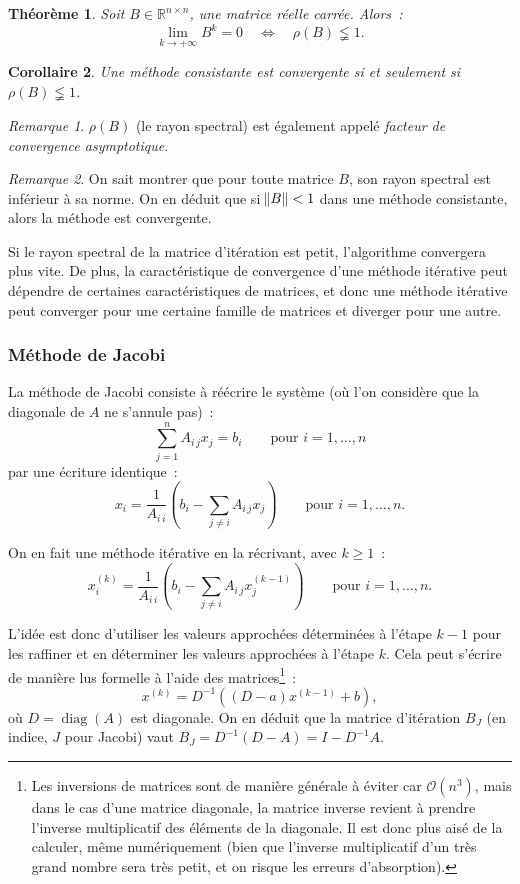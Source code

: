 \documentclass{article}
\newtheorem{thm}{Théorème}[section]
\newtheorem{cor}[thm]{Corollaire}
\theoremstyle{definition}
\theoremstyle{remark}
\newtheorem*{rmq}{Remarque}
\DeclareMathOperator{\diag}{diag}  %
\newcommand{\R}{\mathbb R}
\begin{document}
		\begin{thm} Soit $B \in \R^{n \times n}$, une matrice réelle carrée. Alors~:
		\[\lim_{k \to +\infty}B^k = 0\quad\iff\quad\rho(B) \lneqq 1.\]
		\end{thm}

		\begin{cor} Une méthode consistante est convergente si et seulement si $\rho(B) \lneqq 1$. \end{cor}

		\begin{rmq} $\rho(B)$ (le rayon spectral) est également appelé \emph{facteur de convergence asymptotique}. \end{rmq}

		\begin{rmq} On sait montrer que pour toute matrice $B$, son rayon spectral est inférieur à sa norme. On en déduit que si $\norm B < 1$ dans une méthode
		consistante, alors la méthode est convergente.
		\end{rmq}

		Si le rayon spectral de la matrice d'itération est petit, l'algorithme convergera plus vite. De plus, la caractéristique de convergence d'une méthode
		itérative peut dépendre de certaines caractéristiques de matrices, et donc une méthode itérative peut converger pour une certaine famille de matrices et
		diverger pour une autre.

		\subsubsection{Méthode de Jacobi}
		La méthode de Jacobi consiste à réécrire le système (où l'on considère que la diagonale de $A$ ne s'annule pas)~:
		\[\sum_{j=1}^nA_{i\,j}x_j = b_i\qquad\text{pour }i=1, \dotsc, n\]
		par une écriture identique~:
		\[x_i = \frac 1{A_{i\,i}}\left(b_i - \sum_{j \neq i}A_{i\,j}x_j\right)\qquad\text{pour }i=1, \dotsc, n.\]

		On en fait une méthode itérative en la récrivant, avec $k \geq 1$~:
		\[x^{(k)}_i = \frac 1{A_{i\,i}}\left(b_i - \sum_{j \neq i}A_{i\,j}x^{(k-1)}_j\right)\qquad\text{pour }i=1, \dotsc, n.\]

		L'idée est donc d'utiliser les valeurs approchées déterminées à l'étape $k-1$ pour les raffiner et en déterminer les valeurs approchées à l'étape $k$.
		Cela peut s'écrire de manière lus formelle à l'aide des matrices\footnote{Les inversions de matrices sont de manière générale à éviter car
		$\mathcal O(n^3)$, mais dans le cas d'une matrice diagonale, la matrice inverse revient à prendre l'inverse multiplicatif des éléments de la diagonale.
		Il est donc plus aisé de la calculer, même numériquement (bien que l'inverse multiplicatif d'un très grand nombre sera très petit, et on risque les
		erreurs d'absorption).}~:
		\[x^{(k)} = D^{-1}\left((D-a)x^{(k-1)} + b\right),\]
		où $D = \diag(A)$ est diagonale. On en déduit que la matrice d'itération $B_J$ (en indice, $J$ pour Jacobi) vaut $B_J = D^{-1}(D-A) = I-D^{-1}A$.
\end{document}
